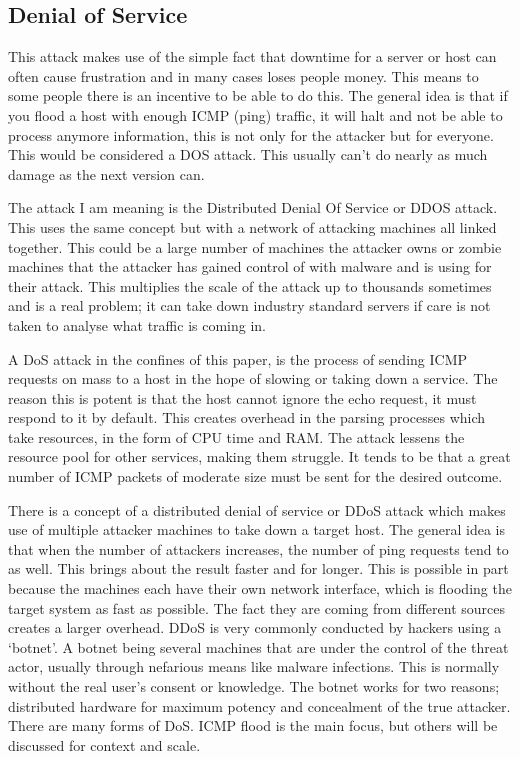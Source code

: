 \subsection{Denial of Service}
This attack makes use of the simple fact that downtime for a server or host can often cause frustration and in many cases loses people money. This means to some people there is an incentive to be able to do this. The general idea is that if you flood a host with enough ICMP (ping) traffic, it will halt and not be able to process anymore information, this is not only for the attacker but for everyone. This would be considered a DOS attack. 
This usually can't do nearly as much damage as the next version can. 

The attack I am meaning is the Distributed Denial Of Service or DDOS attack. This uses the same concept but with a network of attacking machines all linked together. This could be a large number of machines the attacker owns or zombie machines that the attacker has gained control of with malware and is using for their attack. This multiplies the scale of the attack up to thousands sometimes and is a real problem; it can take down industry 
standard servers if care is not taken to analyse what traffic is coming in.

A DoS attack in the confines of this paper, is the process of sending ICMP requests on mass to a host in the hope of slowing or taking down a service. The reason this is potent is that the host cannot ignore the echo request, it must respond to it by default. This creates overhead in the parsing processes which take resources, in the form of CPU time and RAM. The attack lessens the resource pool for other services, making them struggle. 
It tends to be that a great number of ICMP packets of moderate size must be sent for the desired outcome.

There is a concept of a distributed denial of service or DDoS attack which makes use of multiple attacker machines to take down a target host. The general idea is that when the number of attackers increases, the number of ping requests tend to as well. This brings about the result faster and for longer. This is possible in part because the machines each have their own network interface, which is flooding the target system as fast as possible. 
The fact they are coming from different sources creates a larger overhead. DDoS is very commonly conducted by hackers using a ‘botnet’. A botnet being several machines that are under the control of the threat actor, usually through nefarious means like malware infections. This is normally without the real user’s consent or knowledge. The botnet works for two reasons; distributed hardware for maximum potency and concealment of the true attacker. 
There are many forms of DoS. ICMP flood is the main focus, but others will be discussed for context and scale. 

